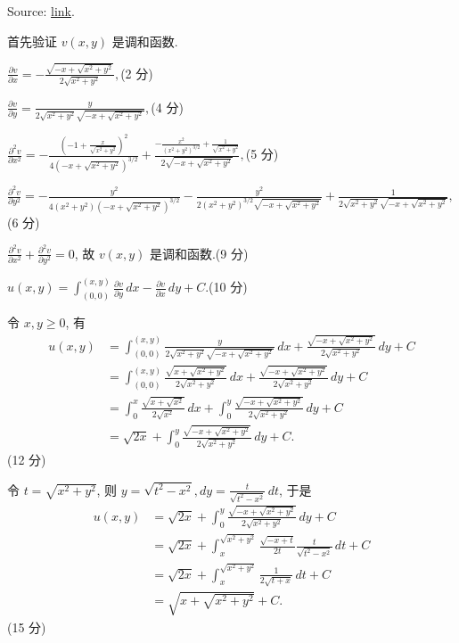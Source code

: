 \documentclass{homework}
\begin{document}
Source: \href{http://ramanujan.math.trinity.edu/rdaileda/teach/m4364f07/hw4_soln.pdf}{link}.


首先验证 \(v(x, y)\) 是调和函数.

\(\frac{\partial v}{\partial x}=-\frac{\sqrt{-x+\sqrt{x^2+y^2}}}{2 \sqrt{x^2+y^2}},\)\hfill (2 分)

\(\frac{\partial v}{\partial y}=\frac{y}{2 \sqrt{x^2+y^2} \sqrt{-x+\sqrt{x^2+y^2}}},\)\hfill (4 分)

\(\frac{\partial^2 v}{\partial x^2}=-\frac{\left(-1+\frac{x}{\sqrt{x^2+y^2}}\right)^2}{4 \left(-x+\sqrt{x^2+y^2}\right)^{3/2}}+\frac{-\frac{x^2}{\left(x^2+y^2\right)^{3/2}}+\frac{1}{\sqrt{x^2+y^2}}}{2 \sqrt{-x+\sqrt{x^2+y^2}}},\)\hfill (5 分)

\(\frac{\partial^2 v}{\partial y^2}=-\frac{y^2}{4 \left(x^2+y^2\right) \left(-x+\sqrt{x^2+y^2}\right)^{3/2}}-\frac{y^2}{2 \left(x^2+y^2\right)^{3/2} \sqrt{-x+\sqrt{x^2+y^2}}}+\frac{1}{2 \sqrt{x^2+y^2} \sqrt{-x+\sqrt{x^2+y^2}}},\)\hfill (6 分)

\(\frac{\partial^2 v}{\partial x^2}+\frac{\partial^2 v}{\partial y^2}=0\), 故 \(v(x, y)\) 是调和函数.\hfill (9 分)

\(u(x,y)=\int_{(0,0)}^{(x,y)}\frac{\partial v}{\partial y}\,dx-\frac{\partial v}{\partial x}\,dy+C\).\hfill (10 分)

令 \(x, y\geq0\), 有
\begin{align*}
  u(x,y)&=\int_{(0,0)}^{(x,y)}\frac{y}{2 \sqrt{x^2+y^2} \sqrt{-x+\sqrt{x^2+y^2}}}\,dx+\frac{\sqrt{-x+\sqrt{x^2+y^2}}}{2 \sqrt{x^2+y^2}}\,dy+C\\
  &=\int_{(0,0)}^{(x,y)}\frac{\sqrt{x+\sqrt{x^2+y^2}}}{2 \sqrt{x^2+y^2}}\,dx+\frac{\sqrt{-x+\sqrt{x^2+y^2}}}{2 \sqrt{x^2+y^2}}\,dy+C\\
  &=\int_{0}^{x}\frac{\sqrt{x+\sqrt{x^2}}}{2 \sqrt{x^2}}\,dx+\int_{0}^{y}\frac{\sqrt{-x+\sqrt{x^2+y^2}}}{2 \sqrt{x^2+y^2}}\,dy+C\\
  &=\sqrt{2x}+\int_{0}^{y}\frac{\sqrt{-x+\sqrt{x^2+y^2}}}{2 \sqrt{x^2+y^2}}\,dy+C.
\end{align*}\hfill (12 分)

令 \(t=\sqrt{x^2+y^2}\), 则 \(y=\sqrt{t^2-x^2}, dy=\frac{t}{\sqrt{t^2-x^2}}\,dt\), 于是
\begin{align*}
  u(x,y)&=\sqrt{2x}+\int_{0}^{y}\frac{\sqrt{-x+\sqrt{x^2+y^2}}}{2 \sqrt{x^2+y^2}}\,dy+C\\
  &=\sqrt{2x}+\int_{x}^{\sqrt{x^2+y^2}}\frac{\sqrt{-x+t}}{2t}\frac{t}{\sqrt{t^2-x^2}}\,dt+C\\
  &=\sqrt{2x}+\int_{x}^{\sqrt{x^2+y^2}}\frac{1}{2\sqrt{t+x}}\,dt+C\\
  &=\sqrt{x+\sqrt{x^2+y^2}}+C.
\end{align*}\hfill (15 分)
\end{document}
